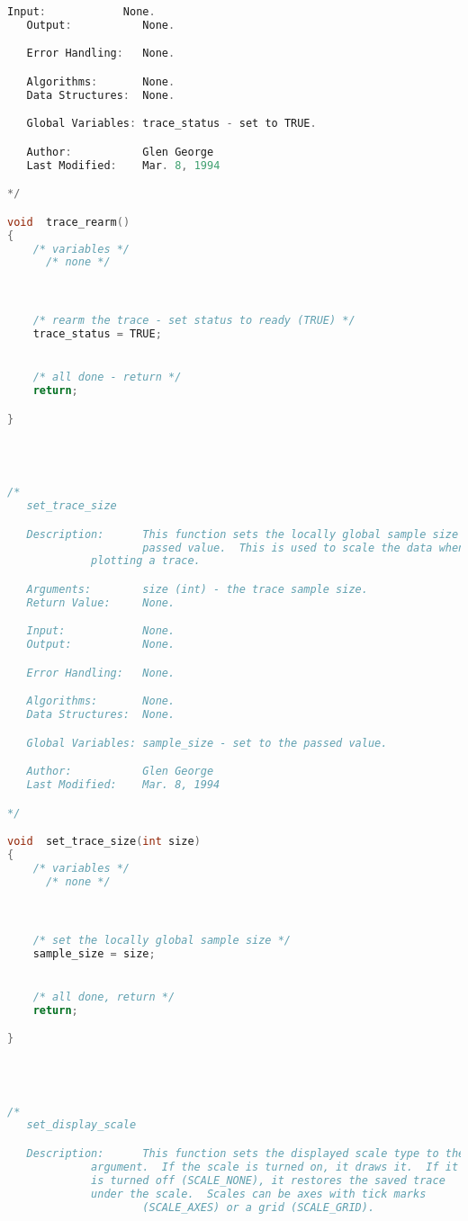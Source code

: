 \begin{lstlisting}[language=C]
   Input:            None.
   Output:           None.

   Error Handling:   None.

   Algorithms:       None.
   Data Structures:  None.

   Global Variables: trace_status - set to TRUE.

   Author:           Glen George
   Last Modified:    Mar. 8, 1994

*/

void  trace_rearm()
{
    /* variables */
      /* none */



    /* rearm the trace - set status to ready (TRUE) */
    trace_status = TRUE;


    /* all done - return */
    return;

}




/*
   set_trace_size

   Description:      This function sets the locally global sample size to the
                     passed value.  This is used to scale the data when
		     plotting a trace.

   Arguments:        size (int) - the trace sample size.
   Return Value:     None.

   Input:            None.
   Output:           None.

   Error Handling:   None.

   Algorithms:       None.
   Data Structures:  None.

   Global Variables: sample_size - set to the passed value.

   Author:           Glen George
   Last Modified:    Mar. 8, 1994

*/

void  set_trace_size(int size)
{
    /* variables */
      /* none */



    /* set the locally global sample size */
    sample_size = size;


    /* all done, return */
    return;

}




/*
   set_display_scale

   Description:      This function sets the displayed scale type to the passed
   		     argument.  If the scale is turned on, it draws it.  If it
		     is turned off (SCALE_NONE), it restores the saved trace
		     under the scale.  Scales can be axes with tick marks
                     (SCALE_AXES) or a grid (SCALE_GRID).


\end{lstlisting}
